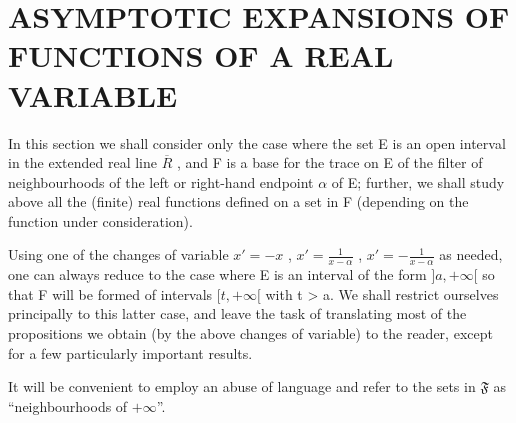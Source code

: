 \section{ASYMPTOTIC EXPANSIONS OF FUNCTIONS OF A REAL VARIABLE}

In this section we shall consider only the case where the set E is an open interval in the extended real line \(\overline{R}\) , and F is a base for the trace on E of the filter of neighbourhoods of the left or right-hand endpoint \(\alpha\) of E; further, we shall study above all the (finite) real functions defined on a set in F (depending on the function under consideration).

Using one of the changes of variable \(x' = -x\) , \(x' = \frac{1}{x - \alpha}\) , \(x' = -\frac{1}{x - \alpha}\) as needed, one can always reduce to the case where E is an interval of the form \(]a, +\infty[\) so that F will be formed of intervals \([t, +\infty[\) with t \textgreater{} a. We shall restrict ourselves principally to this latter case, and leave the task of translating most of the propositions we obtain (by the above changes of variable) to the reader, except for a few particularly important results.

It will be convenient to employ an abuse of language and refer to the sets in \(\mathfrak{F}\) as ``neighbourhoods of \(+\infty\)''.


